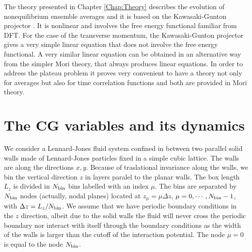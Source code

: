 \documentclass[b5paper,openright,10pt]{book}
\begin{document}
The  theory presented  in Chapter \ref{Chap:Theory} describes  the
evolution of nonequilibrium ensemble averages  and it is based on the
Kawasaki-Gunton  projector \cite{Grabert1982}.   It is  nonlinear and
involves the  free energy functional familiar  from DFT.  For the case of  the transverse momentum, the Kawasaki-Gunton
projector gives  a very simple  linear equation that does  not involve
the free  energy functional.   A very similar  linear equation  can be
obtained  in an  alternative way  from the  simpler Mori  theory, that
always produces  linear equations.   In order  to address  the plateau
problem  it proves  very  convenient to  have a  theory  not only  for
averages but also for time correlation functions and both are provided
in Mori theory.  


\section{The CG variables and its dynamics}

\label{Sec:CGWALLS}
We  consider a  Lennard-Jones  fluid system  confined  in between  two
parallel solid walls made of Lennard-Jones particles fixed in a simple
cubic lattice. The  walls are along the directions  $x,y$.  Because of
traslational invariance along the walls, we bin the vertical direction
$z$ in  layers paralel to the  planar walls.  The box  length $L_z$ is
divided in $N_{\rm bin}$ bins labelled  with an index $\mu$.  The bins
are separated by $N_{\rm bin}$  nodes (actually, nodal planes) located
at  $z_\mu=\mu \Delta  z$, $\mu=0,\cdots,N_{\rm  bin}-1$, with  $\Delta
z=L_z/N_{\rm  bin}$.   We  assume   that  we  have  periodic  boundary
conditions in  the $z$ direction,  albeit due  to the solid  walls the
fluid will never cross the  periodic boundary nor interact with itself
through the  boundary conditions as the  width of the walls  is larger
than the  cutoff of  the interaction potential.   The node  $\mu=0$ is
equal to  the node  $N_{\rm bin}$.   
\end{document}
